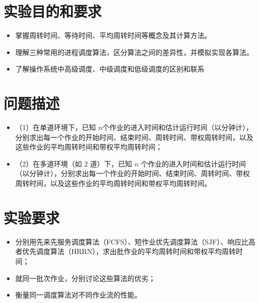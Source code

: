 \documentclass[12pt,hyperref,a4paper,UTF8]{ctexart}
\begin{document}
\cover

%
%

\thispagestyle{empty} %

\newpage
\tableofcontents

\newpage


\section{实验目的和要求}
\begin{itemize}
    \item 掌握周转时间、等待时间、平均周转时间等概念及其计算方法。
    \item 理解三种常用的进程调度算法，区分算法之间的差异性，并模拟实现各算法。
    \item 了解操作系统中高级调度、中级调度和低级调度的区别和联系
\end{itemize}

\section{问题描述}
    \begin{itemize}
        \item （1）在单道环境下，已知 $n$个作业的进入时间和估计运行时间（以分钟计），分别求出每一个作业的开始时间、结束时间、周转时间、带权周转时间，以及这些作业的平均周转时间和带权平均周转时间；
        \item （2）在多道环境（如 2 道）下，已知 $n$ 个作业的进入时间和估计运行时间（以分钟计），分别求出每一个作业的开始时间、结束时间、周转时间、带权周转时间，以及这些作业的平均周转时间和带权平均周转时间。
    \end{itemize}

\section{实验要求}
    \begin{itemize}
        \item 分别用先来先服务调度算法（FCFS）、短作业优先调度算法（SJF）、响应比高者优先调度算法（HRRN），求出批作业的平均周转时间和带权平均周转时间；
        \item 就同一批次作业，分别讨论这些算法的优劣；
        \item 衡量同一调度算法对不同作业流的性能。
    \end{itemize}
\end{document}
